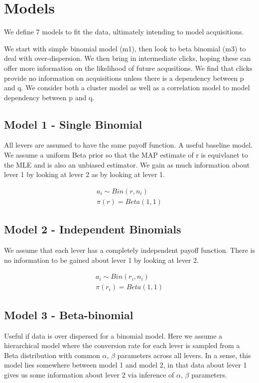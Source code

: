 \documentclass[12pt]{article}
\begin{document}
\section{Models}
We define 7 models to fit the data, ultimately intending to model acquisitions.

We start with simple binomial model (m1), then look to beta binomial (m3) to deal with over-dispersion. We then bring in intermediate clicks, hoping these can offer more information on the likelihood of future acqusitions. We find that clicks provide no information on acquisitions unless there is a dependency between p and q. We consider both a cluster model as well as a correlation model to model dependency between p and q.

\subsection{Model 1 - Single Binomial} 
All levers are assumed to have the same payoff function. A useful baseline model. We assume a uniform Beta prior so that the MAP estimate of r is equivlanet to the MLE and is also an unbiased estimator. We gain as much information about lever 1 by looking at lever 2 as by looking at lever 1.

  \begin{align}
	a_i \sim Bin(r,n_i) \\
	\pi(r) = Beta(1,1)
  \end{align}

\subsection{Model 2 - Independent Binomials} 
We assume that each lever has a completely independent payoff function. There is no information to be gained about lever 1 by looking at lever 2.

  \begin{align}
	a_i \sim Bin(r_i,n_i) \\
	\pi(r_i) = Beta(1,1)
  \end{align}

\subsection{Model 3 - Beta-binomial} 
Useful if data is over dispersed for a binomial model. Here we assume a hierarchical model where the conversion rate for each lever is sampled from a Beta distribution with common $\alpha$, $\beta$ parameters across all levers. In a sense, this model lies somewhere between model 1 and model 2, in that data about lever 1 gives us some information about lever 2 via inference of $\alpha$, $\beta$ parameters. 
\end{document}
